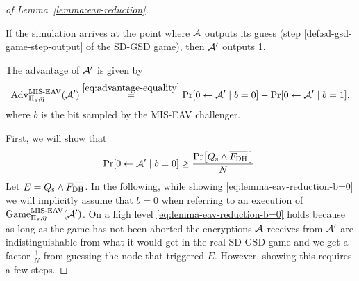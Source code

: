 \begin{proof}[of Lemma~\ref{lemma:eav-reduction}]
\begin{enumerate}[1.]
		      If the simulation arrives at the point where $\mathcal{A}$ outputs its guess (step \ref{def:sd-gsd-game-step-output} of the SD-GSD game), then $\mathcal{A}'$ outputs 1.
	\end{enumerate}

	The advantage of $\mathcal{A}'$ is given by
	\begin{equation} \label{eq:lemma-eav-reduction-advantage}
		\advantage{\Pi_s}{\eta}{MIS\text{-}EAV}(\adv') \stackrel{\eqref{eq:advantage-equality}}{=}  \pr{0 \from \adv' \mid b = 0} - \pr{0 \from \adv' \mid b = 1},
	\end{equation}
	where $b$ is the bit sampled by the MIS-EAV challenger.


	First, we will show that
	\begin{equation} \label{eq:lemma-eav-reduction-b=0}
		\pr{0 \from \adv' \mid b = 0} \ge \frac{\pr{\qs \land \overline{\fdh}\,}}{N}.
	\end{equation}
	Let $E = Q_\mathrm{s} \land \overline{F_\mathrm{DH}}$. In the following, while showing \eqref{eq:lemma-eav-reduction-b=0} we will implicitly assume that $b = 0$ when referring to an execution of $\mathrm{Game}_{\Pi_s, \eta}^{\mathrm{MIS\text{-}EAV}}(\mathcal{A}')$.
	On a high level \eqref{eq:lemma-eav-reduction-b=0} holds because as long as the game has not been aborted the encryptions $\mathcal{A}$ receives from $\mathcal{A}'$ are indistinguishable from what it would get in the real SD-GSD game and we get a factor $\frac{1}{N}$ from guessing the node that triggered $E$. However, showing this requires a few steps.


\end{proof}
